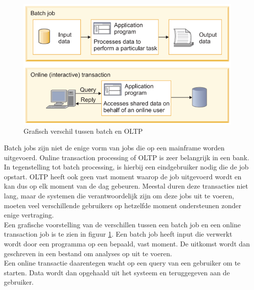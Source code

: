 \begin{figure}[ph!]
    \centering
    \includegraphics[width=400pt]{./graphics/BatchVSOnline.png}
    \caption{Grafisch verschil tussen batch en OLTP \autocite{IBMb}}
    \label{fig:online}
\end{figure}


Batch jobs zijn niet de enige vorm van jobs die op een mainframe worden uitgevoerd. Online transaction processing of OLTP is zeer belangrijk in een bank. In tegenstelling tot batch processing, is hierbij een eindgebruiker nodig die de job opstart. OLTP heeft ook geen vast moment waarop de job uitgevoerd wordt en kan dus op elk moment van de dag gebeuren. Meestal duren deze transacties niet lang, maar de systemen die verantwoordelijk zijn om deze jobs uit te voeren, moeten veel verschillende gebruikers op hetzelfde moment ondersteunen zonder enige vertraging. \autocite{IBMb} \\

Een grafische voorstelling van de verschillen tussen een batch job en een online transaction job is te zien in figuur \ref{fig:online}. Een batch job heeft input die verwerkt wordt door een programma op een bepaald, vast moment. De uitkomst wordt dan geschreven in een bestand om analyses op uit te voeren. \\
Een online transactie daarentegen wacht op een query van een gebruiker om te starten. Data wordt dan opgehaald uit het systeem en teruggegeven aan de gebruiker. \autocite{IBMb}


